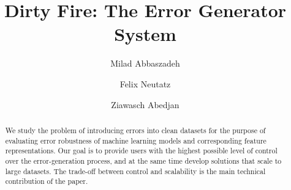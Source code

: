 \documentclass[conference]{IEEEtran}
\begin{document}
\title{Dirty Fire: The Error Generator System}

\author[1]{Milad Abbaszadeh}
\author[2]{Felix Neutatz}
\author[1]{Ziawasch Abedjan}



\maketitle



\begin{abstract}
We study the problem of introducing errors into clean datasets for the purpose of evaluating error robustness of machine learning models and corresponding 
feature representations. Our goal is to provide users with the highest possible level of control over the error-generation process, and at the same time develop solutions that scale to large datasets.
The trade-off between control and scalability is the main technical contribution of the paper.
\end{abstract}









\end{document}
